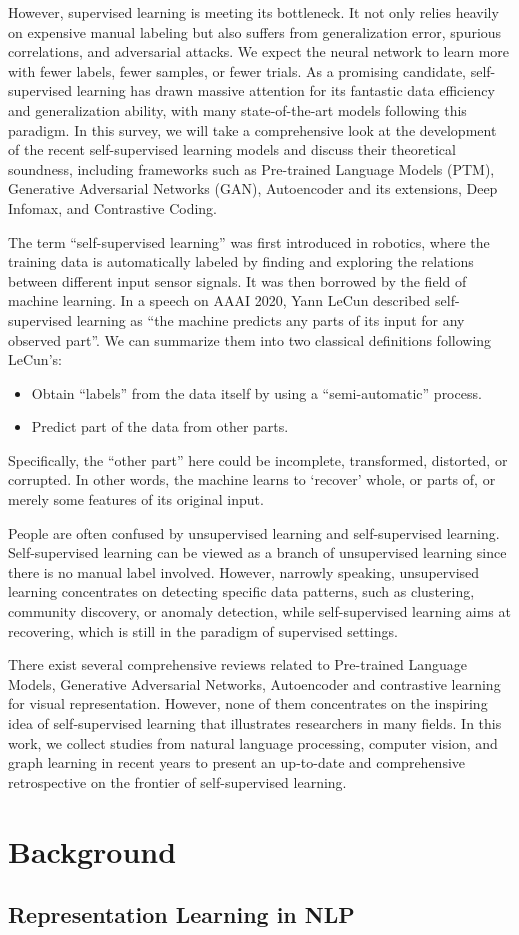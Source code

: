 \documentclass[conference]{IEEEtran}
\begin{document}
However, supervised learning is meeting its bottleneck. 
It not only relies heavily on expensive manual labeling but 
also suffers from generalization error, spurious correlations, 
and adversarial attacks. 
We expect the neural network to learn more with fewer labels, 
fewer samples, or fewer trials.
As a promising  candidate, self-supervised learning has drawn 
massive attention for its fantastic data efficiency and 
generalization ability, with many state-of-the-art models 
following this paradigm. 
In this survey, we will take a comprehensive look at the development
of the recent self-supervised learning models and discuss 
their theoretical soundness, including frameworks such as Pre-trained
Language Models (PTM), Generative Adversarial Networks (GAN),
Autoencoder and its extensions, Deep Infomax, and Contrastive Coding.

The term ``self-supervised learning'' was first introduced in robotics,
where the training data is automatically labeled by finding and 
exploring the relations between different input sensor signals.
It was then borrowed by the field of machine learning.
In a speech on AAAI 2020, Yann LeCun described self-supervised 
learning as ``the machine predicts any parts of its input for 
any observed part''.
We can summarize them into two classical definitions following 
LeCun's:
\begin{itemize}
    \item Obtain ``labels'' from the data itself by using a ``semi-automatic'' process.
    \item Predict part of the data from other parts.
\end{itemize}
Specifically, the ``other part'' here could be incomplete, 
transformed, distorted, or corrupted. In other words, the machine 
learns to `recover' whole, or parts of, or merely some features 
of its original input.

People are often confused by unsupervised learning and self-supervised learning.
Self-supervised learning can be viewed as a branch of unsupervised learning
since there is no manual label involved.
However, narrowly speaking, unsupervised learning concentrates on 
detecting specific data patterns, such as clustering, community discovery,
or anomaly detection, while self-supervised learning aims at recovering,
which is still in the paradigm of supervised settings.

There exist several comprehensive reviews related to Pre-trained Language Models,
Generative Adversarial Networks, Autoencoder and contrastive learning for 
visual representation. 
However, none of them concentrates on the inspiring idea of self-supervised learning 
that illustrates researchers in many fields. 
In this work, we collect studies from natural language processing, 
computer vision, and graph learning in recent years to present an 
up-to-date and comprehensive retrospective on the frontier of self-supervised learning.

\section{Background}
\subsection{Representation Learning in NLP}



\end{document}
